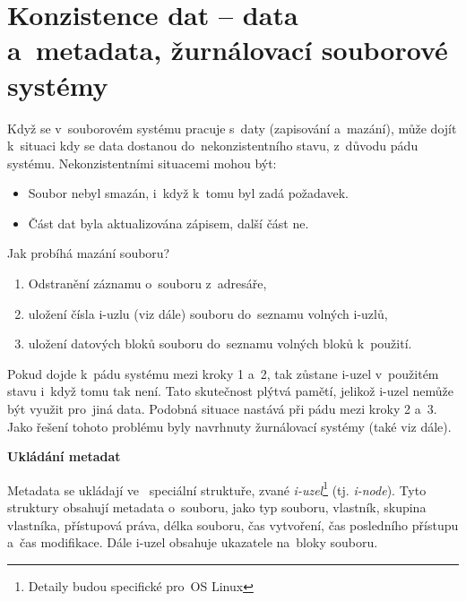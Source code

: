 
\clearpage
\section{Konzistence dat -- data a~metadata, žurnálovací souborové systémy}

Když se v~souborovém systému pracuje s~daty (zapisování a~mazání), může dojít k~situaci kdy se data dostanou do~nekonzistentního stavu, z~důvodu pádu systému. Nekonzistentními situacemi mohou být:

\begin{itemize}
    \item Soubor nebyl smazán, i~když k~tomu byl zadá požadavek.
    \item Část dat byla aktualizována zápisem, další část ne. 
\end{itemize}

Jak probíhá mazání souboru?

\begin{enumerate}
    \item Odstranění záznamu o~souboru z~adresáře,
    \item uložení čísla i-uzlu (viz dále) souboru do~seznamu volných i-uzlů,
    \item uložení datových bloků souboru do~seznamu volných bloků k~použití.
\end{enumerate}

Pokud dojde k~pádu systému mezi kroky 1 a~2, tak zůstane i-uzel v~použitém stavu i~když tomu tak není. Tato skutečnost plýtvá pamětí, jelikož i-uzel nemůže být využit pro~jiná data. Podobná situace nastává při pádu mezi kroky 2 a~3. Jako řešení tohoto problému byly navrhnuty žurnálovací systémy (také viz dále). 

\begin{Large}
    \vspace{0,5cm}
    \textbf{Ukládání metadat}
\end{Large}

Metadata se ukládají ve~ speciální struktuře, zvané \emph{i-uzel}\footnote{Detaily budou specifické pro~OS Linux} (tj. \emph{i-node}). Tyto struktury obsahují metadata o~souboru, jako typ souboru, vlastník, skupina vlastníka, přístupová práva, délka souboru, čas vytvoření, čas posledního přístupu a~čas modifikace. Dále i-uzel obsahuje ukazatele na~bloky souboru. 

\vspace{0,5cm}

